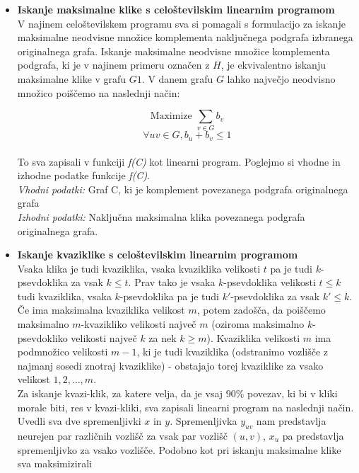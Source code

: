 \documentclass[12pt,a4paper]{amsart}
\theoremstyle{definition}
\theoremstyle{plain}
\begin{document}
\begin{itemize}
\item \textbf{Iskanje maksimalne klike s celoštevilskim linearnim programom}
\\

V najinem celoštevilskem programu sva si pomagali s formulacijo za iskanje maksimalne neodvisne množice komplementa naključnega podgrafa izbranega originalnega grafa. Iskanje maksimalne neodvisne množice komplementa podgrafa, ki je v najinem primeru označen z $H$, je ekvivalentno iskanju maksimalne klike v grafu $G1$. V danem grafu $G$ lahko največjo neodvisno množico poiščemo na naslednji način:

 $$\text{Maximize }\sum_{v\in G}b_v$$ $$\forall uv \in G, b_u + b_v \le 1$$\\
 
To sva zapisali v funkciji \textit{f(C)} kot linearni program. Poglejmo si vhodne in izhodne podatke funkcije \textit{f(C)}.
\\

\textit{Vhodni podatki:} Graf C, ki je komplement povezanega podgrafa originalnega grafa
\\

\textit{Izhodni podatki:} Naključna maksimalna klika povezanega podgrafa originalnega grafa.
\\

\item \textbf{Iskanje kvaziklike s celoštevilskim linearnim programom}
\\

Vsaka klika je tudi kvaziklika, vsaka kvaziklika velikosti $t$ pa je tudi $k$-psevdoklika za vsak $k \le  t$. Prav tako je vsaka $k$-psevdoklika velikosti $t \le k$ tudi kvaziklika, vsaka $k$-psevdoklika pa je tudi $k'$-psevdoklika za vsak $k' \le k$. 
\\
Če ima maksimalna kvaziklika velikost $m$, potem zadošča, da poiščemo maksimalno $m$-kvazikliko velikosti največ $m$ (oziroma maksimalno $k$-psevdokliko velikosti največ $k$ za nek $k \geq m$). Kvaziklika velikosti $m$ ima podmnožico velikosti $m-1$, ki je tudi kvaziklika (odstranimo vozlišče z najmanj sosedi znotraj kvaziklike) - obstajajo torej kvaziklike za vsako velikost $1, 2, \ldots, m$.
\\

Za iskanje kvazi-klik, za katere velja, da je vsaj $90\%$ povezav, ki bi v kliki morale biti, res v kvazi-kliki, sva zapisali linearni program na naslednji način. \\

Uvedli sva dve spremenljivki $x$ in $y$. Spremenljivka $y_{uv}$ nam predstavlja neurejen par različnih vozlišč za vsak par vozlišč $(u,v)$, $x_u$ pa predstavlja spremenljivko za vsako vozlišče. Podobno kot pri iskanju maksimalne klike sva maksimizirali


\end{itemize}
\end{document}
